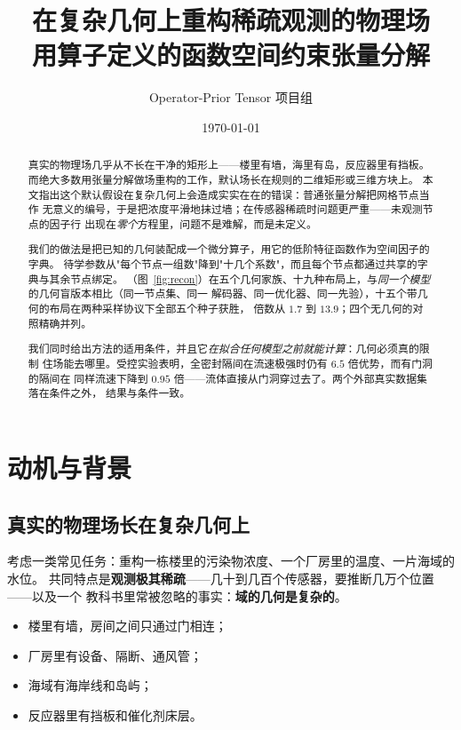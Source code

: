\documentclass[11pt,a4paper]{article}
\title{\bfseries 在复杂几何上重构稀疏观测的物理场\\[4pt]
\large 用算子定义的函数空间约束张量分解}
\author{Operator-Prior Tensor 项目组}
\date{\today}
\begin{document}
\maketitle

\begin{abstract}
\noindent
真实的物理场几乎从不长在干净的矩形上——楼里有墙，海里有岛，反应器里有挡板。
而绝大多数用张量分解做场重构的工作，默认场长在规则的二维矩形或三维方块上。
本文指出这个默认假设在复杂几何上会造成实实在在的错误：普通张量分解把网格节点当作
无意义的编号，于是把浓度平滑地抹过墙；在传感器稀疏时问题更严重——未观测节点的因子行
出现在\emph{零个}方程里，问题不是难解，而是未定义。

我们的做法是把已知的几何装配成一个微分算子，用它的低阶特征函数作为空间因子的字典。
待学参数从"每个节点一组数"降到"十几个系数"，而且每个节点都通过共享的字典与其余节点绑定。
（图~\ref{fig:recon}）在五个几何家族、十九种布局上，与\emph{同一个模型}的几何盲版本相比（同一节点集、同一
解码器、同一优化器、同一先验），十五个带几何的布局在两种采样协议下全部五个种子获胜，
倍数从 $1.7$ 到 $13.9$；四个无几何的对照精确并列。

我们同时给出方法的适用条件，并且它\emph{在拟合任何模型之前就能计算}：几何必须真的限制
住场能去哪里。受控实验表明，全密封隔间在流速极强时仍有 $6.5$ 倍优势，而有门洞的隔间在
同样流速下降到 $0.95$ 倍——流体直接从门洞穿过去了。两个外部真实数据集落在条件之外，
结果与条件一致。
\end{abstract}

\tableofcontents
\newpage

\section{动机与背景}

\subsection{真实的物理场长在复杂几何上}

考虑一类常见任务：重构一栋楼里的污染物浓度、一个厂房里的温度、一片海域的水位。
共同特点是\textbf{观测极其稀疏}——几十到几百个传感器，要推断几万个位置——以及一个
教科书里常被忽略的事实：\textbf{域的几何是复杂的}。

\begin{itemize}
\item 楼里有墙，房间之间只通过门相连；
\item 厂房里有设备、隔断、通风管；
\item 海域有海岸线和岛屿；
\item 反应器里有挡板和催化剂床层。
\end{itemize}
\end{document}

